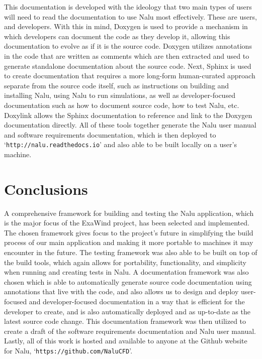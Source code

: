 \documentclass[12pt, oneside]{article}
\begin{document}
This documentation is developed with the ideology that two main types of users will need to read the documentation to use Nalu most effectively. These are users, and developers. With this in mind, Doxygen is used to provide a mechanism in which developers can document the code as they develop it, allowing this documentation to evolve as if it is the source code. Doxygen utilizes annotations in the code that are written as comments which are then extracted and used to generate standalone documentation about the source code. Next, Sphinx is used to create documentation that requires a more long-form human-curated approach separate from the source code itself, such as instructions on building and installing Nalu, using Nalu to run simulations, as well as developer-focused documentation such as how to document source code, how to test Nalu, etc. Doxylink allows the Sphinx documentation to reference and link to the Doxygen documentation directly. All of these tools together generate the Nalu user manual and software requirements documentation, which is then deployed to `\texttt{http://nalu.readthedocs.io}' and also able to be built locally on a user's machine.

\section{Conclusions}

A comprehensive framework for building and testing the Nalu application, which is the major focus of the ExaWind project, has been selected and implemented. The chosen framework gives focus to the project's future in simplifying the build process of our main application and making it more portable to machines it may encounter in the future. The testing framework was also able to be built on top of the build tools, which again allows for portability, functionality, and simplicity when running and creating tests in Nalu. A documentation framework was also chosen which is able to automatically generate source code documentation using annotations that live with the code, and also allows us to design and deploy user-focused and developer-focused documentation in a way that is efficient for the developer to create, and is also automatically deployed and as up-to-date as the latest source code change. This documentation framework was then utilized to create a draft of the software requirements documentation and Nalu user manual. Lastly, all of this work is hosted and available to anyone at the Github website for Nalu, `\texttt{https://github.com/NaluCFD}'.
\end{document}
